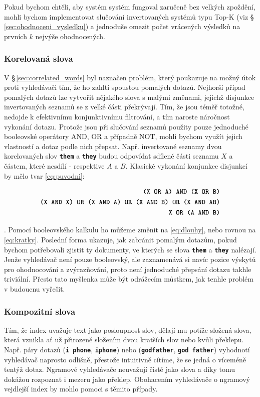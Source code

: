 \documentclass[11pt,letterpaper,oneside,openright]{book}
\newcommand{\bftt}[1]{\texttt{\textbf{#1}}}
\begin{document}
Pokud bychom chtěli, aby systém systém fungoval zaručeně bez velkých zpoždění,
mohli bychom implementovat slučování invertovaných systémů typu Top-K (viz
\S\,\ref{sec:ohodnoceni_vysledku}) a jednoduše omezit počet vrácených výsledků
na prvních $k$ nejvýše ohodnocených.

\subsubsection{Korelovaná slova}
V \S\,\ref{sec:correlated_words} byl naznačen problém, který poukazuje na možný
útok proti vyhledávači tím, že ho zahltí spoustou pomalých dotazů. Nejhorší
případ pomalých dotazů lze vytvořit nějakého slova s malými změnami, jejichž
disjunkce invertovaných seznamů se z velké části překrývají. Tím, že jsou téměř
totožné, nedojde k efektivnímu konjunktivnímu filtrování, a tím naroste
náročnost vykonání dotazu. Protože jsou při slučování seznamů použity pouze
jednoduché booleovské operátory AND, OR a případně NOT, mohli bychom využít
jejich vlastností a dotaz podle nich přepsat. Např. invertované seznamy dvou
korelovaných slov \bftt{them} a \bftt{they} budou odpovídat sdílené části
seznamu $X$ a částem, které nesdílí - respektive $A$ a $B$. Klasické vykonání
konjunkce disjunkcí by mělo tvar \ref{eq:puvodni}:

\begin{align}
\bftt{(X OR A) AND (X OR B)} \label{eq:puvodni} \\
\bftt{(X AND X) OR (X AND A) OR (X AND B) OR (X AND AB)} \label{eq:dlouhy} \\
\bftt{X OR (A AND B)} \label{eq:kratky}
\end{align}

. Pomocí booleovského kalkulu ho můžeme změnit na \ref{eq:dlouhy}, nebo rovnou
na \ref{eq:kratky}. Poslední forma ukazuje, jak zabránit pomalým dotazům, pokud
bychom potřebovali zjistit ty dokumenty, ve kterých se slova \bftt{them} a
\bftt{they} nalézají. Jenže vyhledávač není pouze booleovský, ale zaznamenává
si navíc pozice výskytů pro ohodnocování a zvýrazňování, proto není jednoduché
přepsání dotazu takhle triviální. Přesto tato myšlenka může být odrážecím
můstkem, jak tenhle problém v budoucnu vyřešit.

\subsubsection{Kompozitní slova}
Tím, že index uvažuje text jako posloupnost slov, dělají mu potíže složená
slova, která vznikla ať už přirozeně složením dvou kratších slov nebo kvůli
překlepu. Např. páry dotazů (\bftt{i phone}, \bftt{iphone}) nebo
(\bftt{godfather}, \bftt{god father}) vyhodnotí vyhledávač naprosto odlišně,
přestože intuitivně cítíme, že se jedná o víceméně tentýž dotaz. Ngramové
vyhledávače neuvažují čistě jako slova a díky tomu dokážou rozpoznat i mezeru
jako překlep. Obohacením vyhledávače o ngramový vejdlejší index by mohlo pomoci
s těmito případy.
\end{document}
